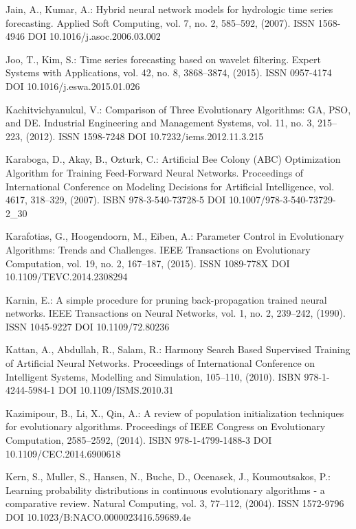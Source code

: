 \begin{thebibliography}{99.}
 Jain, A., Kumar, A.: Hybrid neural network models for hydrologic time series forecasting. Applied Soft Computing, vol. 7, no. 2, 585--592, (2007). ISSN 1568-4946 DOI 10.1016/j.asoc.2006.03.002

 Joo, T., Kim, S.: Time series forecasting based on wavelet filtering. Expert Systems with Applications, vol. 42, no. 8, 3868--3874, (2015). ISSN 0957-4174 DOI 10.1016/j.eswa.2015.01.026

 Kachitvichyanukul, V.: Comparison of Three Evolutionary Algorithms: GA, PSO, and DE. Industrial Engineering and Management Systems, vol. 11, no. 3, 215--223, (2012). ISSN 1598-7248 DOI 10.7232/iems.2012.11.3.215

 Karaboga, D., Akay, B., Ozturk, C.: Artificial Bee Colony (ABC) Optimization Algorithm for Training Feed-Forward Neural Networks. Proceedings of International Conference on Modeling Decisions for Artificial Intelligence, vol. 4617, 318--329, (2007). ISBN 978-3-540-73728-5 DOI 10.1007/978-3-540-73729-2\_30

 Karafotias, G., Hoogendoorn, M., Eiben, A.: Parameter Control in Evolutionary Algorithms: Trends and Challenges. IEEE Transactions on Evolutionary Computation, vol. 19, no. 2, 167--187, (2015). ISSN 1089-778X DOI 10.1109/TEVC.2014.2308294

 Karnin, E.: A simple procedure for pruning back-propagation trained neural networks. IEEE Transactions on Neural Networks, vol. 1, no. 2, 239--242, (1990). ISSN 1045-9227 DOI 10.1109/72.80236

 Kattan, A., Abdullah, R., Salam, R.: Harmony Search Based Supervised Training of Artificial Neural Networks. Proceedings of International Conference on Intelligent Systems, Modelling and Simulation, 105--110, (2010). ISBN 978-1-4244-5984-1 DOI 10.1109/ISMS.2010.31

 Kazimipour, B., Li, X., Qin, A.: A review of population initialization techniques for evolutionary algorithms. Proceedings of IEEE Congress on Evolutionary Computation, 2585--2592, (2014). ISBN 978-1-4799-1488-3 DOI 10.1109/CEC.2014.6900618

 Kern, S., Muller, S., Hansen, N., Buche, D., Ocenasek, J., Koumoutsakos, P.: Learning probability distributions in continuous evolutionary algorithms - a comparative review. Natural Computing, vol. 3, 77--112, (2004). ISSN 1572-9796 DOI 10.1023/B:NACO.0000023416.59689.4e


\end{thebibliography}
